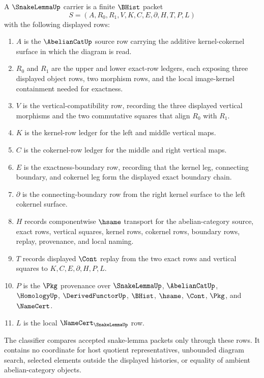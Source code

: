 \begin{definition}
\label{def:snake-lemma-carrier}
A $\SnakeLemmaUp$ carrier is a finite $\BHist$ packet
$$
S=(A,R_0,R_1,V,K,C,E,\partial,H,T,P,L)
$$
with the following displayed rows:
\begin{enumerate}
\item $A$ is the $\AbelianCatUp$ source row carrying the additive kernel-cokernel surface in which the diagram is read.
\item $R_0$ and $R_1$ are the upper and lower exact-row ledgers, each exposing three displayed object rows, two morphism rows, and the local image-kernel containment needed for exactness.
\item $V$ is the vertical-compatibility row, recording the three displayed vertical morphisms and the two commutative squares that align $R_0$ with $R_1$.
\item $K$ is the kernel-row ledger for the left and middle vertical maps.
\item $C$ is the cokernel-row ledger for the middle and right vertical maps.
\item $E$ is the exactness-boundary row, recording that the kernel leg, connecting boundary, and cokernel leg form the displayed exact boundary chain.
\item $\partial$ is the connecting-boundary row from the right kernel surface to the left cokernel surface.
\item $H$ records componentwise $\hsame$ transport for the abelian-category source, exact rows, vertical squares, kernel rows, cokernel rows, boundary rows, replay, provenance, and local naming.
\item $T$ records displayed $\Cont$ replay from the two exact rows and vertical squares to $K,C,E,\partial,H,P,L$.
\item $P$ is the $\Pkg$ provenance over $\SnakeLemmaUp$, $\AbelianCatUp$, $\HomologyUp$, $\DerivedFunctorUp$, $\BHist$, $\hsame$, $\Cont$, $\Pkg$, and $\NameCert$.
\item $L$ is the local $\NameCert_{\SnakeLemmaUp}$ row.
\end{enumerate}
The classifier compares accepted snake-lemma packets only through these rows. It contains no coordinate for host quotient representatives, unbounded diagram search, selected elements outside the displayed histories, or equality of ambient abelian-category objects.
\end{definition}

